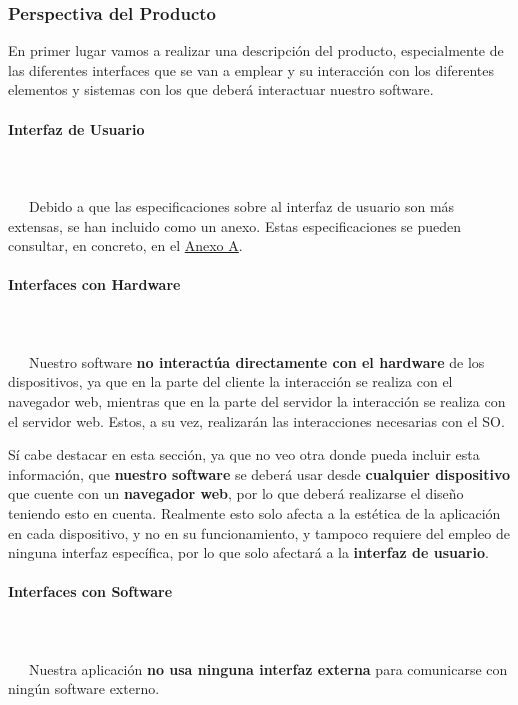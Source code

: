 \subsubsection{Perspectiva del Producto}
En primer lugar vamos a realizar una descripción del producto, especialmente de las diferentes interfaces que se van a emplear y su interacción con los diferentes elementos y sistemas con los que deberá interactuar nuestro software.

\paragraph{Interfaz de Usuario}
~\\\\
\-\ \-\ \-\ Debido a que las especificaciones sobre al interfaz de usuario son más extensas, se han incluido como un anexo. Estas especificaciones se pueden consultar, en concreto, en el \hyperref[sec:apenA]{Anexo A}.


\paragraph{Interfaces con Hardware}
~\\\\
\-\ \-\ \-\ Nuestro software \textbf{no interactúa directamente con el hardware} de los dispositivos, ya que en la parte del cliente la interacción se realiza con el navegador web, mientras que en la parte del servidor la interacción se realiza con el servidor web. Estos, a su vez, realizarán las interacciones necesarias con el SO.

Sí cabe destacar en esta sección, ya que no veo otra donde pueda incluir esta información, que \textbf{nuestro software} se deberá usar desde \textbf{cualquier dispositivo} que cuente con un \textbf{navegador web}, por lo que deberá realizarse el diseño teniendo esto en cuenta. Realmente esto solo afecta a la estética de la aplicación en cada dispositivo, y no en su funcionamiento, y tampoco requiere del empleo de ninguna interfaz específica, por lo que solo afectará a la \textbf{interfaz de usuario}. 


\paragraph{Interfaces con Software}
~\\\\
\-\ \-\ \-\ Nuestra aplicación \textbf{no usa ninguna interfaz externa} para comunicarse con ningún software externo. 


